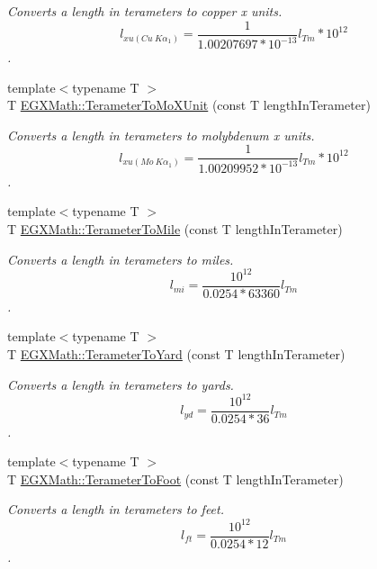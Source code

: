 \begin{DoxyCompactItemize}
\begin{DoxyCompactList}\small\item\em Converts a length in terameters to copper x units. \[ l_{xu(Cu\ K\alpha_1)}= \frac{1}{1.00207697*10^{-13}} l_{Tm} * 10^{12}\]. \end{DoxyCompactList}\item 
{\footnotesize template$<$typename T $>$ }\\T \mbox{\hyperlink{group___e_g_x_math-_conversions-_length_conversions-_s_i-_terameter-_non-_s_i_ga391bcf9b529c2e20f2773c699bb0197a}{E\+G\+X\+Math\+::\+Terameter\+To\+Mo\+X\+Unit}} (const T length\+In\+Terameter)
\begin{DoxyCompactList}\small\item\em Converts a length in terameters to molybdenum x units. \[ l_{xu(Mo\ K\alpha_1)}=\frac{1}{1.00209952*10^{-13}} l_{Tm} * 10^{12}\]. \end{DoxyCompactList}\item 
{\footnotesize template$<$typename T $>$ }\\T \mbox{\hyperlink{group___e_g_x_math-_conversions-_length_conversions-_s_i-_terameter-_imperial_ga51468f3ffd5925fb2cbb188d49b6aa60}{E\+G\+X\+Math\+::\+Terameter\+To\+Mile}} (const T length\+In\+Terameter)
\begin{DoxyCompactList}\small\item\em Converts a length in terameters to miles. \[ l_{mi}=\frac{10^{12}}{0.0254 * 63360} l_{Tm} \]. \end{DoxyCompactList}\item 
{\footnotesize template$<$typename T $>$ }\\T \mbox{\hyperlink{group___e_g_x_math-_conversions-_length_conversions-_s_i-_terameter-_imperial_ga4f3bcac82e02fddb21fedf80ec01275b}{E\+G\+X\+Math\+::\+Terameter\+To\+Yard}} (const T length\+In\+Terameter)
\begin{DoxyCompactList}\small\item\em Converts a length in terameters to yards. \[ l_{yd}= \frac{10^{12}}{0.0254 * 36} l_{Tm} \]. \end{DoxyCompactList}\item 
{\footnotesize template$<$typename T $>$ }\\T \mbox{\hyperlink{group___e_g_x_math-_conversions-_length_conversions-_s_i-_terameter-_imperial_gaf903b744223a3acb964367da6f14b96f}{E\+G\+X\+Math\+::\+Terameter\+To\+Foot}} (const T length\+In\+Terameter)
\begin{DoxyCompactList}\small\item\em Converts a length in terameters to feet. \[ l_{ft}= \frac{10^{12}}{0.0254 * 12} l_{Tm} \]. \end{DoxyCompactList}\item 

\end{DoxyCompactItemize}
